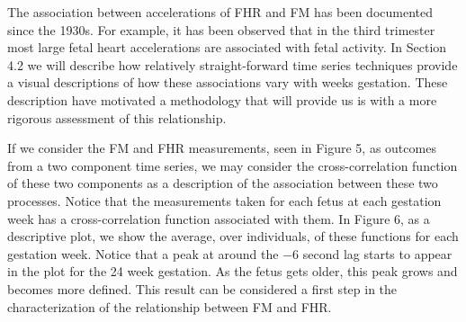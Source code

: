 The association between accelerations of FHR and    
FM has been documented since the 1930s. For
example, it has been observed 
that in the third trimester most large fetal heart
accelerations are 
associated with fetal activity.
In Section 4.2 we will describe how relatively straight-forward time
series techniques provide a visual descriptions of how these
associations vary with weeks gestation. These description have
motivated a methodology that will provide us is with a more rigorous
assessment of this relationship.

If we consider the FM and FHR  measurements, seen in Figure 5, as
outcomes from a two component time series, we may consider the
cross-correlation function of these two components as a description of
the association between these two processes. Notice that the
measurements taken for each 
fetus at each gestation week has a cross-correlation function associated
with them. In Figure 6, as a descriptive plot, we show the average,
over individuals,
of these functions for each gestation
week. Notice that a peak at around the $-6$ second lag starts to
appear in the plot for the 24 week gestation. As the fetus gets older,
this peak grows and becomes more defined. This result
can be 
considered a first step in the characterization of the relationship
between FM and FHR. 

\centerline{}
\centerline{}
